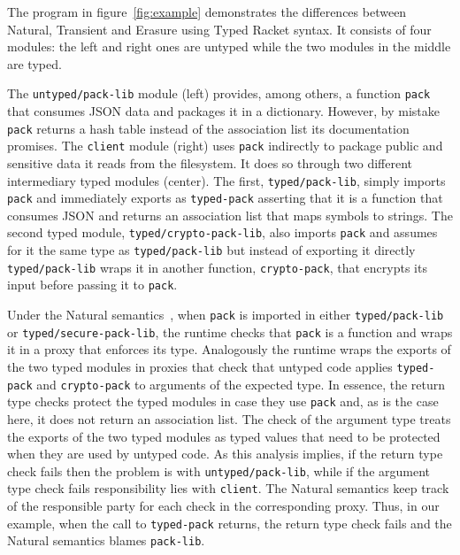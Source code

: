 
The  program in figure~\ref{fig:example} demonstrates the differences
between Natural, Transient and Erasure using Typed Racket syntax.  It
consists of four modules: the left and right ones are untyped while
the two modules in the middle are typed.

The \texttt{untyped/pack-lib} module (left) provides, among
others, a function \texttt{pack} that consumes JSON data and packages it
in a dictionary. However, by mistake \texttt{pack} returns
a hash table instead of the association list its documentation promises.
The \texttt{client} module (right) uses \texttt{pack} indirectly to
package public and sensitive data it reads from the filesystem. It does so
through two different intermediary typed modules (center). The first,
\texttt{typed/pack-lib}, simply imports \texttt{pack} and immediately
exports as \texttt{typed-pack} asserting that it is a function
that consumes JSON and returns an association list that maps symbols to
strings. The second typed module, \texttt{typed/crypto-pack-lib},
also imports \texttt{pack} and assumes for it the same type as
\texttt{typed/pack-lib} but instead of exporting it directly \texttt{typed/pack-lib} wraps it in
another function, \texttt{crypto-pack}, that encrypts its input before
passing it to \texttt{pack}.

Under the Natural semantics~\cite{tf-popl-2008,tfffgksst-snapl-2017}, when
\texttt{pack} is imported in either \texttt{typed/pack-lib} or
\texttt{typed/secure-pack-lib}, the runtime checks that \texttt{pack} is a
function and wraps it in a proxy that enforces its  type.  Analogously
the runtime wraps the exports of the two typed modules in proxies that
check that untyped code applies \texttt{typed-pack} and
\texttt{crypto-pack} to arguments of the expected type. In essence, the
return type checks protect  the typed modules in case they use
\texttt{pack} and, as is the case here, it does not return an association
list. The check of the argument type  treats the
exports of the two typed modules as typed values that need to be protected
when they are used by untyped code.  As this analysis implies, if the
return type check fails then the problem is with
\texttt{untyped/pack-lib}, while if the argument type check fails
responsibility lies with \texttt{client}. The Natural semantics keep track
of the responsible party for each check in the corresponding proxy. Thus,
in our example, when the call to \texttt{typed-pack} returns, the return
type check fails and the Natural semantics blames \texttt{pack-lib}.

